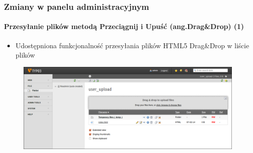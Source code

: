 
\begin{frame}[fragile]
	\frametitle{Zmiany w panelu administracyjnym}
	\framesubtitle{Przesyłanie plików metodą Przeciągnij i Upuść (ang.Drag\&Drop) (1)}

	\begin{itemize}
		\item Udostępniona funkcjonalność przesyłania plików HTML5 Drag\&Drop w liście plików 

	\end{itemize}

	\begin{figure}
		\includegraphics[width=0.95\linewidth]{Images/BackendChanges/DragDropFileUpload.png}
	\end{figure}

\end{frame}


